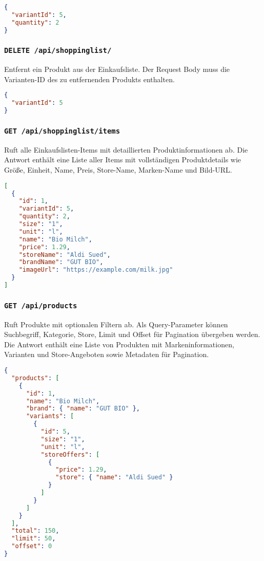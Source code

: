 \begin{lstlisting}[language=JSON]
{
  "variantId": 5,
  "quantity": 2
}
\end{lstlisting}

\subsubsection{\texttt{DELETE /api/shoppinglist/}}

Entfernt ein Produkt aus der Einkaufsliste. Der Request Body muss die Varianten-ID des zu entfernenden Produkts enthalten.

\begin{lstlisting}[language=JSON]
{
  "variantId": 5
}
\end{lstlisting}

\subsubsection{\texttt{GET /api/shoppinglist/items}}

Ruft alle Einkaufslisten-Items mit detaillierten Produktinformationen ab. Die Antwort enthält eine Liste aller Items mit vollständigen Produktdetails wie Größe, Einheit, Name, Preis, Store-Name, Marken-Name und Bild-URL.

\begin{lstlisting}[language=JSON]
[
  {
    "id": 1,
    "variantId": 5,
    "quantity": 2,
    "size": "1",
    "unit": "l",
    "name": "Bio Milch",
    "price": 1.29,
    "storeName": "Aldi Sued",
    "brandName": "GUT BIO",
    "imageUrl": "https://example.com/milk.jpg"
  }
]
\end{lstlisting}

\subsubsection{\texttt{GET /api/products}}

Ruft Produkte mit optionalen Filtern ab. Als Query-Parameter können Suchbegriff, Kategorie, Store, Limit und Offset für Pagination übergeben werden. Die Antwort enthält eine Liste von Produkten mit Markeninformationen, Varianten und Store-Angeboten sowie Metadaten für Pagination.

\begin{lstlisting}[language=JSON]
{
  "products": [
    {
      "id": 1,
      "name": "Bio Milch",
      "brand": { "name": "GUT BIO" },
      "variants": [
        {
          "id": 5,
          "size": "1",
          "unit": "l",
          "storeOffers": [
            {
              "price": 1.29,
              "store": { "name": "Aldi Sued" }
            }
          ]
        }
      ]
    }
  ],
  "total": 150,
  "limit": 50,
  "offset": 0
}
\end{lstlisting}

